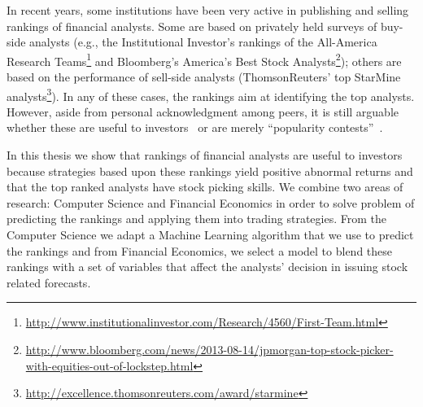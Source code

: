 
In recent years, some institutions have been very active in publishing and  selling  rankings of financial analysts. Some  are based on privately held surveys of  buy-side analysts (e.g., the Institutional Investor's rankings of the All-America Research Teams\footnote{\url{http://www.institutionalinvestor.com/Research/4560/First-Team.html}} and Bloomberg's America's Best Stock Analysts\footnote{\sloppy \url{http://www.bloomberg.com/news/2013-08-14/jpmorgan-top-stock-picker-with-equities-out-of-lockstep.html}}); others are based on the performance of sell-side analysts (ThomsonReuters' top StarMine analysts\footnote{\url{http://excellence.thomsonreuters.com/award/starmine}}). In any of these cases, the rankings aim at identifying the top analysts. However, aside from personal acknowledgment among peers, it is still arguable whether these are useful to investors~\citep{desai2000ass} or are merely ``popularity contests''~\citep{emery2009}. 




In this thesis we show that rankings of financial analysts are useful to investors because strategies based upon these rankings yield positive abnormal returns and that the top ranked analysts have stock picking skills. We combine two areas of research: Computer Science and Financial Economics in order to solve  problem of predicting the rankings and applying them into trading strategies. From the Computer Science we adapt a Machine Learning algorithm that we use to predict the rankings and from Financial Economics, we select a model to blend these rankings with a set of variables that affect the analysts' decision in issuing stock related forecasts. 





